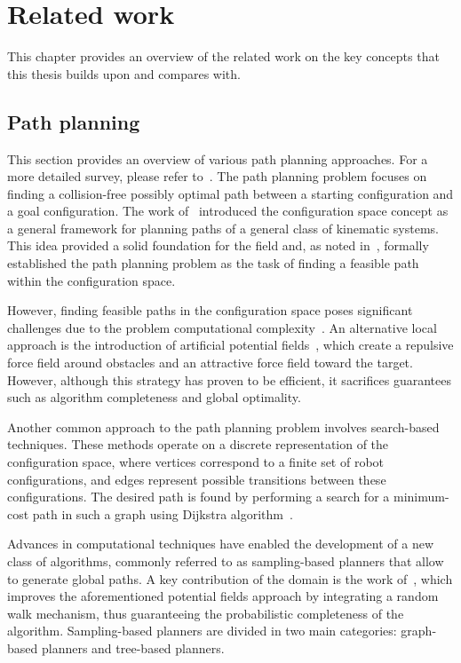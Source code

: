 \chapter{Related work}\label{chap:related_work}

This chapter provides an overview of the related work on the key concepts that this thesis builds upon and compares with.

\section{Path planning}

This section provides an overview of various path planning approaches. 
For a more detailed survey, please refer to~\cite{cLavalle, cFrazzoli, cKavraki}.
The path planning problem focuses on finding a collision-free possibly optimal path between a starting configuration and a goal configuration. 
The work of~\cite{cConfigSpace} introduced the configuration space concept as a general framework for planning paths of a general class of kinematic systems.
This idea provided a solid foundation for the field and, as noted in~\cite{cSpatialPlan}, formally established the path planning problem as the task of finding a feasible path within the configuration space.

However, finding feasible paths in the configuration space poses significant challenges due to the problem computational complexity~\cite{cComplexity}. 
An alternative local approach is the introduction of artificial potential fields~\cite{cAPF}, which create a repulsive force field around obstacles and an attractive force field toward the target.
However, although this strategy has proven to be efficient, it sacrifices guarantees such as algorithm completeness and global optimality.

Another common approach to the path planning problem involves search-based techniques. 
These methods operate on a discrete representation of the configuration space, where vertices correspond to a finite set of robot configurations, and edges represent possible transitions between these configurations.
The desired path is found by performing a search for a minimum-cost path in such a graph using Dijkstra algorithm~\cite{cDijk}. 

Advances in computational techniques have enabled the development of a new class of algorithms, commonly referred to as sampling-based planners that allow to generate global paths.
A key contribution of the domain is the work of~\cite{cLatombe}, which improves the aforementioned potential fields approach by integrating a random walk mechanism, thus guaranteeing the probabilistic completeness of the algorithm.
Sampling-based planners are divided in two main categories: graph-based planners and tree-based planners.

